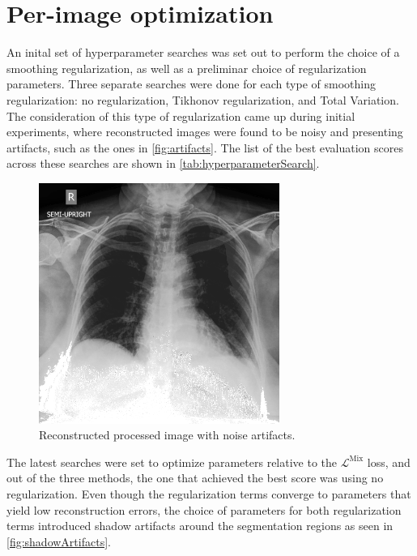 \documentclass[nomenclature, english, bibtex]{kththesis}
\numberwithin{listing}{chapter}
\begin{document}
\section{Per-image optimization}

An inital set of hyperparameter searches was set out to perform the choice of a smoothing regularization, as well as a preliminar
choice of regularization parameters. Three separate searches were done for each type of smoothing regularization:
no regularization, Tikhonov regularization, and Total Variation. The consideration of this type of regularization came up during
initial experiments, where reconstructed images were found to be noisy and presenting artifacts, such as the ones in
\autoref{fig:artifacts}. The list of the best evaluation scores across these searches are shown in \autoref{tab:hyperparameterSearch}.

\begin{figure}[ht]
    \centering
    \includegraphics[width=0.7\textwidth]{figures/noisy.png}
    \caption{Reconstructed processed image with noise artifacts.}
    \label{fig:artifacts}
\end{figure}

The latest searches were set to optimize parameters relative to the $\mathcal{L}^{\text{Mix}}$ loss, and out of the three methods, the one
that achieved the best score was using no regularization. Even though the regularization terms converge to parameters
that yield low reconstruction errors, the choice of parameters for both regularization terms introduced
shadow artifacts around the segmentation regions as seen in \autoref{fig:shadowArtifacts}.
\end{document}
